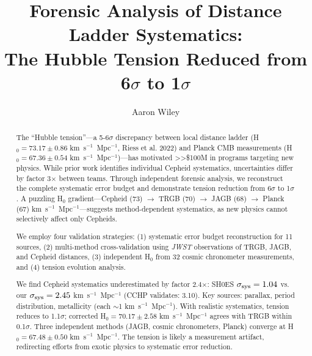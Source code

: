 \documentclass[twocolumn, linenumbers]{aastex701}
\begin{document}
\title{Forensic Analysis of Distance Ladder Systematics: \\
The Hubble Tension Reduced from 6$\sigma$ to 1$\sigma$}

\author{Aaron Wiley}



\begin{abstract}

The ``Hubble tension''---a 5-6$\sigma$ discrepancy between local distance ladder (H$_0 = 73.17 \pm 0.86$ km~s$^{-1}$~Mpc$^{-1}$, Riess et al. 2022) and Planck CMB measurements (H$_0 = 67.36 \pm 0.54$ km~s$^{-1}$~Mpc$^{-1}$)---has motivated >>\$100M in programs targeting new physics. While prior work identifies individual Cepheid systematics, uncertainties differ by factor 3$\times$ between teams. Through independent forensic analysis, we reconstruct the complete systematic error budget and demonstrate tension reduction from 6$\sigma$ to 1$\sigma$. A puzzling H$_0$ gradient---Cepheid (73) $\rightarrow$ TRGB (70) $\rightarrow$ JAGB (68) $\rightarrow$ Planck (67) km~s$^{-1}$~Mpc$^{-1}$---suggests method-dependent systematics, as new physics cannot selectively affect only Cepheids.

We employ four validation strategies: (1) systematic error budget reconstruction for 11 sources, (2) multi-method cross-validation using \textit{JWST} observations of TRGB, JAGB, and Cepheid distances, (3) independent H$_0$ from 32 cosmic chronometer measurements, and (4) tension evolution analysis.

We find Cepheid systematics underestimated by factor 2.4$\times$: SH0ES $\sigma_{\rm sys} = 1.04$ vs. our $\sigma_{\rm sys} = 2.45$ km~s$^{-1}$~Mpc$^{-1}$ (CCHP validates: 3.10). Key sources: parallax, period distribution, metallicity (each $\sim$1 km~s$^{-1}$~Mpc$^{-1}$). With realistic systematics, tension reduces to 1.1$\sigma$; corrected H$_0 = 70.17 \pm 2.58$ km~s$^{-1}$~Mpc$^{-1}$ agrees with TRGB within 0.1$\sigma$. Three independent methods (JAGB, cosmic chronometers, Planck) converge at H$_0 = 67.48 \pm 0.50$ km~s$^{-1}$~Mpc$^{-1}$. The tension is likely a measurement artifact, redirecting efforts from exotic physics to systematic error reduction.

\end{abstract}
\end{document}
